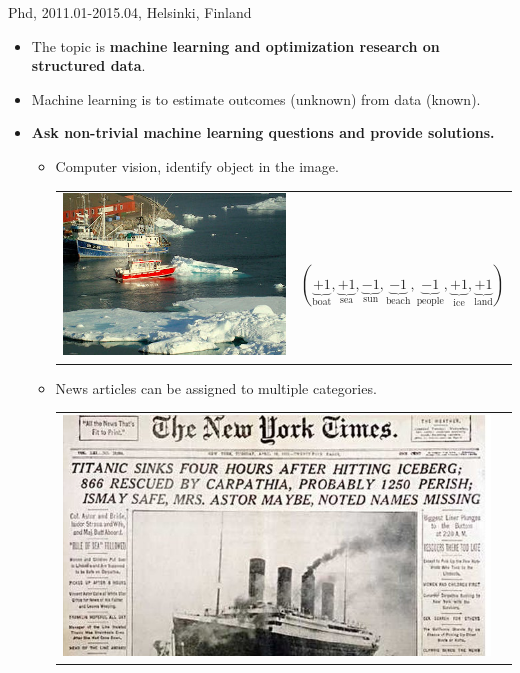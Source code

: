 \documentclass[first=dgreen,second=purple,logo=yellowexc]{aaltoslides}
\begin{document}
\begin{frame}{Phd, 2011.01-2015.04, Helsinki, Finland}
	\begin{itemize}
		\item The topic is {\bf machine learning and optimization research on structured data}.
		\item Machine learning is to estimate outcomes (unknown) from data (known).
		\item {\bf Ask non-trivial machine learning questions and provide solutions.}
		\begin{itemize}\footnotesize
			\item Computer vision, identify object in the image.
			\begin{tabular}{p{3cm}p{10cm}}
	        \multirow{2}{*}{\includegraphics[scale = 0.13]{./plots/boatsea.png}} & \\
			& $(\underbrace{+1}_{\text{boat}},\underbrace{+1}_{\text{sea}},\underbrace{-1}_{\text{sun}},\underbrace{-1}_{\text{beach}},\underbrace{-1}_{\text{people}},\underbrace{+1}_{\text{ice}},\underbrace{+1}_{\text{land}})$\\
	        \end{tabular}
	\vspace{0.3cm}
			\item News articles can be assigned to multiple categories.
			\begin{tabular}{p{3cm}p{10cm}} 
	        \multirow{2}{*}{\includegraphics[scale = 0.13]{./plots/titanic.jpg}} & \\

\end{tabular}
\end{itemize}
\end{itemize}
\end{frame}
\end{document}
